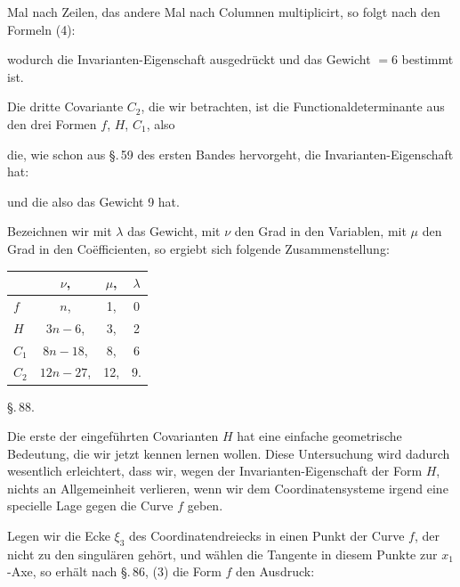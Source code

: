 Mal nach Zeilen, das andere Mal nach Columnen multiplicirt, so
folgt nach den Formeln (4):


wodurch die Invarianten-Eigenschaft ausgedrückt und das Gewicht
$= 6$ bestimmt ist.

Die dritte Covariante $C_2$, die wir betrachten, ist die Functionaldeterminante
 aus den drei Formen $f$, $H$, $C_1$, also


die, wie schon aus \S.\,59 des ersten Bandes hervorgeht, die
Invarianten-Eigenschaft hat:


und die also das Gewicht 9 hat.

Bezeichnen wir mit $\lambda$ das Gewicht, mit $\nu$ den Grad in den
Variablen, mit $\mu$ den Grad in den Coëfficienten, so ergiebt sich
folgende Zusammenstellung:

\begin{center}
\begin{tabular}{lccc}
 & $\nu$, & $\mu$, & $\lambda$ \\
\hline
$f$ & $n$, & 1, & 0 \\
$H$ & $3n-6$, & 3, & 2 \\
$C_1$ & $8n-18$, & 8, & 6 \\
$C_2$ & $12n-27$, & 12, & 9.
\end{tabular}
\end{center}

\begin{center}
\S.\,88.

\end{center}

Die erste der eingeführten Covarianten $H$ hat eine einfache
geometrische Bedeutung, die wir jetzt kennen lernen wollen.
Diese Untersuchung wird dadurch wesentlich erleichtert, dass
wir, wegen der Invarianten-Eigenschaft der Form $H$, nichts an
Allgemeinheit verlieren, wenn wir dem Coordinatensysteme irgend
eine specielle Lage gegen die Curve $f$ geben.

Legen wir die Ecke $\xi_3$ des Coordinatendreiecks in einen
Punkt der Curve $f$, der nicht zu den singulären gehört, und
wählen die Tangente in diesem Punkte zur $x_1$-Axe, so erhält
nach \S.\,86, (3) die Form $f$ den Ausdruck:


